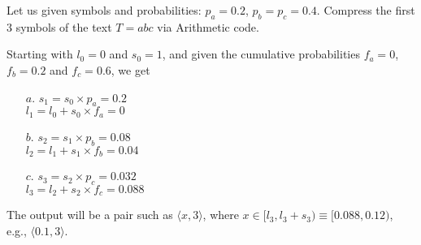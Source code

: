 \exercise

Let us given symbols and probabilities: $p_a = 0.2$, $p_b = p_c = 0.4$. Compress
the first 3 symbols of the text $T = abc$ via Arithmetic code.

\solution

Starting with $l_0 = 0$ and $s_0 = 1$, and given the cumulative probabilities
$f_a =0$, $f_b = 0.2$ and $f_c = 0.6$, we get
%
\begin{itemize}
  \item[$a$.] $s_1 = s_0 \times p_a = 0.2$ \\ $l_1 = l_0 + s_0 \times f_a = 0$
  \item[$b$.] $s_2 = s_1 \times p_b = 0.08$ \\ $l_2 = l_1 + s_1 \times f_b = 0.04$
  \item[$c$.] $s_3 = s_2 \times p_c = 0.032$ \\ $l_3 = l_2 + s_2 \times f_c = 0.088$
\end{itemize}
%
The output will be a pair such as $\langle x, 3 \rangle$, where $x \in [l_3, l_3
+ s_3) \equiv [0.088, 0.12)$, e.g., $\langle 0.1, 3 \rangle$.
